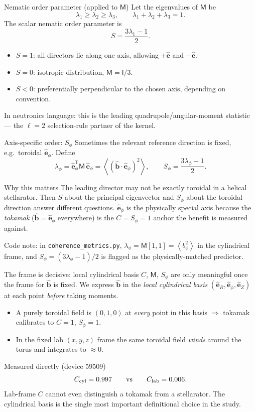 \documentclass[aspectratio=169]{beamer}
\newcommand{\bb}{\hat{\bm b}}
\newcommand{\be}{\hat{\bm e}}
\newcommand{\I}{\mathsf I}
\newcommand{\T}{\mathsf T}
\newcommand{\avg}[1]{\left\langle #1 \right\rangle}
\newcommand{\M}{\mathsf M}
\newcommand{\ephi}{\hat{\bm e}_\phi}
\newcommand{\Sphi}{S_\phi}
\newcommand{\lamphi}{\lambda_\phi}
\begin{document}
\begin{frame}[t]{Nematic order parameter (applied to $\M$)}
Let the eigenvalues of $\M$ be
\[
\lambda_1\ge \lambda_2\ge \lambda_3,
\qquad
\lambda_1+\lambda_2+\lambda_3=1.
\]
The scalar nematic order parameter is
\[
S=\frac{3\lambda_1-1}{2}.
\]
\begin{itemize}
  \item $S=1$: all directors lie along one axis, allowing $+\be$ and $-\be$.
  \item $S=0$: isotropic distribution, $\M=\I/3$.
  \item $S<0$: preferentially perpendicular to the chosen axis, depending on convention.
\end{itemize}
\vspace{0.3em}
In neutronics language: this is the leading quadrupole/angular-moment statistic --- the $\ell=2$ selection-rule partner of the kernel.
\end{frame}

\begin{frame}[t]{Axis-specific order: $\Sphi$}
Sometimes the relevant reference direction is fixed, e.g.\ toroidal $\ephi$.
Define
\[
\lamphi = \ephi^\T\M\,\ephi
= \avg{(\bb\cdot\ephi)^2},
\qquad
\Sphi = \frac{3\lamphi-1}{2}.
\]
\begin{block}{Why this matters}
The leading director may not be exactly toroidal in a helical stellarator. Then $S$ about the principal eigenvector and $\Sphi$ about the toroidal direction answer different questions. $\ephi$ is the physically special axis because the \emph{tokamak} ($\bb=\ephi$ everywhere) is the $C=S_\phi=1$ anchor the benefit is measured against.
\end{block}
\alert{Code note:} in \texttt{coherence\_metrics.py}, $\lamphi=\M[1,1]=\avg{b_\phi^2}$ in the cylindrical frame, and $\Sphi=(3\lamphi-1)/2$ is flagged as the physically-matched predictor.
\end{frame}

\begin{frame}[t]{The frame is decisive: local cylindrical basis}
$C$, $\M$, $\Sphi$ are only meaningful once the frame for $\bb$ is fixed. We express $\bb$ in the \emph{local cylindrical basis} $(\be_R,\ephi,\be_Z)$ at each point \emph{before} taking moments.
\begin{itemize}
  \item A purely toroidal field is $(0,1,0)$ at \emph{every} point in this basis $\Rightarrow$ tokamak calibrates to $C=1$, $\Sphi=1$.
  \item In the fixed lab $(x,y,z)$ frame the same toroidal field \emph{winds} around the torus and integrates to $\approx 0$.
\end{itemize}
\begin{block}{Measured directly (device 59509)}
\[
C_{\rm cyl}=0.997 \qquad\text{vs}\qquad C_{\rm lab}=0.006 .
\]
Lab-frame $C$ cannot even distinguish a tokamak from a stellarator. The cylindrical basis is the single most important definitional choice in the study.
\end{block}
\end{frame}
\end{document}
